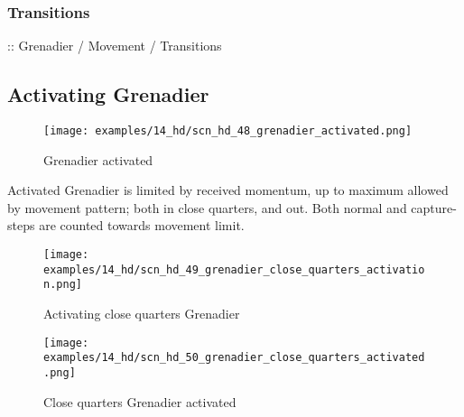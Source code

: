 \clearpage %

\subsubsection*{Transitions}
\label{sec:Hemera's Dawn/Grenadier/Movement/Transitions}

\TODO :: Grenadier / Movement / Transitions

\clearpage %

\subsection*{Activating Grenadier}
\label{sec:Hemera's Dawn/Grenadier/Activating Grenadier}

\vspace*{-0.7\baselineskip}
\noindent
\begin{wrapfigure}[7]{l}{0.4\textwidth}
\centering
\texttt{[image: examples/14\_hd/scn\_hd\_48\_grenadier\_activated.png]}
\vspace*{-0.5\baselineskip}
\caption{Grenadier activated}
\label{fig:scn_hd_48_grenadier_activated}
\end{wrapfigure}
Activated Grenadier is limited by received momentum, up to maximum allowed by movement
pattern; both in close quarters, and out. Both normal and capture-steps are counted
towards movement limit.

\vspace*{0.4\baselineskip}
\noindent
\begin{figure}[!h]
\texttt{[image: examples/14\_hd/scn\_hd\_49\_grenadier\_close\_quarters\_activation.png]}
\vspace*{-1.4\baselineskip}
\caption{Activating close quarters Grenadier}
\label{fig:scn_hd_49_grenadier_close_quarters_activation}
\end{figure}

\vspace*{-1.2\baselineskip}
\noindent
\begin{figure}[!h]
\texttt{[image: examples/14\_hd/scn\_hd\_50\_grenadier\_close\_quarters\_activated.png]}
\vspace*{-1.4\baselineskip}
\caption{Close quarters Grenadier activated}
\label{fig:scn_hd_50_grenadier_close_quarters_activated}
\end{figure}

